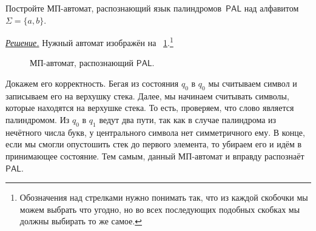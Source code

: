 \documentclass[10pt]{article}
\newcommand{\figref}[1]{\figurename~\ref{#1}}
\newcounter{pr} \setcounter{pr}{0}
\newenvironment{sol}
  {\par
   {\itshape \underline{Решение.}}}
  {}
\newcommand{\eps}{\varepsilon}
\newcommand{\PAL}{{\mathsf{PAL}}}
\begin{document}
  \title{\ptitle}
  \author{\pauthor, \pgroup}
  \date{\pdate}
  \maketitle
  \thispagestyle{fancytitlepage}
  \begin{pr}
    Постройте МП-автомат, распознающий язык палиндромов~$\PAL$ над алфавитом
    $\Sigma = \{a, b\}$.
    \begin{sol}
      Нужный автомат изображён на \figref{fig:PAL}.\footnote{Обозначения над
      стрелками нужно понимать так, что из каждой скобочки мы можем выбрать что
      угодно, но во всех последующих подобных скобках мы должны выбирать то же
      самое.}
      \begin{figure}[ht]
        \centering
        \caption{МП-автомат, распознающий $\PAL$.}
        \label{fig:PAL}
      \end{figure}
      Докажем его корректность. Бегая из состояния $q_0$ в $q_0$ мы считываем
      символ и записываем его на верхушку стека. Далее, мы начинаем считывать
      символы, которые находятся на верхушке стека. То есть, проверяем, что
      слово является палиндромом. Из $q_0$ в $q_1$ ведут два пути, так как в
      случае палиндрома из нечётного числа букв, у центрального символа нет
      симметричного ему. В конце, если мы смогли опустошить стек до первого
      элемента, то убираем его и идём в принимающее состояние. Тем самым, данный
      МП-автомат и вправду распознаёт $\PAL$.
    \end{sol}
  \end{pr}
\end{document}
